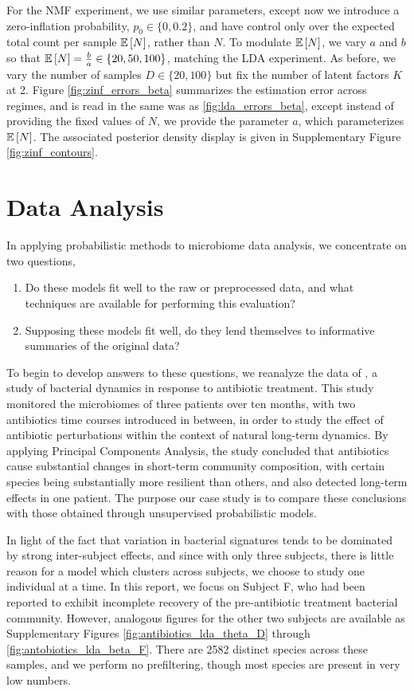 \documentclass[oupdraft]{bio}
\begin{document}
For the NMF experiment, we use similar parameters, except now we introduce a
zero-inflation probability, $p_{0} \in \{0, 0.2\}$, and have control only over
the expected total count per sample $\mathbb{E}\left[{N}\right]$, rather than $N$. To
modulate $\mathbb{E}\left[{N}\right]$, we vary $a$ and $b$ so that $\mathbb{E}\left[{N}\right] = \frac{b}{a} \in
\{20, 50, 100\}$, matching the LDA experiment. As before, we vary the number of
samples $D \in \{20, 100\}$ but fix the number of latent factors $K$ at 2.
Figure \ref{fig:zinf_errors_beta} summarizes the estimation error across
regimes, and is read in the same was as \ref{fig:lda_errors_beta}, except
instead of providing the fixed values of $N$, we provide the parameter $a$,
which parameterizes $\mathbb{E}\left[{N}\right]$. The associated posterior density display is
given in Supplementary Figure \ref{fig:zinf_contours}.

\section{Data Analysis}

In applying probabilistic methods to microbiome data analysis, we concentrate on
two questions,
\begin{enumerate}
\item Do these models fit well to the raw or preprocessed data, and what techniques
are available for performing this evaluation?
\item Supposing these models fit well, do they lend themselves to informative
summaries of the original data?
\end{enumerate}

To begin to develop answers to these questions, we reanalyze the data of
\citep{dethlefsen2011incomplete}, a study of bacterial dynamics in response to
antibiotic treatment. This study monitored the microbiomes of three patients
over ten months, with two antibiotics time courses introduced in between, in
order to study the effect of antibiotic perturbations within the context of
natural long-term dynamics. By applying Principal Components Analysis, the study
concluded that antibiotics cause substantial changes in short-term community
composition, with certain species being substantially more resilient than
others, and also detected long-term effects in one patient. The purpose our case
study is to compare these conclusions with those obtained through unsupervised
probabilistic models.

In light of the fact that variation in bacterial signatures tends to be
dominated by strong inter-subject effects, and since with only three subjects,
there is little reason for a model which clusters across subjects, we choose to
study one individual at a time. In this report, we focus on Subject F, who had
been reported to exhibit incomplete recovery of the pre-antibiotic treatment
bacterial community. However, analogous figures for the other two subjects are
available as Supplementary Figures \ref{fig:antibiotics_lda_theta_D} through
\ref{fig:antobiotics_lda_beta_F}. There are 2582 distinct species across these
samples, and we perform no prefiltering, though most species are present in very
low numbers.
\end{document}

